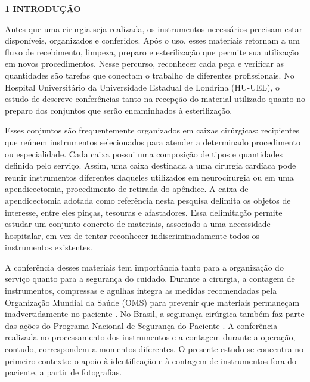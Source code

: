 \begingroup
\justifying
\setlength{\parindent}{1.25cm}
\setlength{\parskip}{0pt}
\onehalfspacing
\setlength{\emergencystretch}{1em}

{}
\noindent\textbf{1 INTRODUÇÃO}\par
\vspace{\baselineskip}

Antes que uma cirurgia seja realizada, os instrumentos necessários precisam estar disponíveis, organizados e conferidos. Após o uso, esses materiais retornam a um fluxo de recebimento, limpeza, preparo e esterilização que permite sua utilização em novos procedimentos. Nesse percurso, reconhecer cada peça e verificar as quantidades são tarefas que conectam o trabalho de diferentes profissionais. No Hospital Universitário da Universidade Estadual de Londrina (HU-UEL), o estudo de \textcite{moreto2025} descreve conferências tanto na recepção do material utilizado quanto no preparo dos conjuntos que serão encaminhados à esterilização.

Esses conjuntos são frequentemente organizados em caixas cirúrgicas: recipientes que reúnem instrumentos selecionados para atender a determinado procedimento ou especialidade. Cada caixa possui uma composição de tipos e quantidades definida pelo serviço. Assim, uma caixa destinada a uma cirurgia cardíaca pode reunir instrumentos diferentes daqueles utilizados em neurocirurgia ou em uma apendicectomia, procedimento de retirada do apêndice. A caixa de apendicectomia adotada como referência nesta pesquisa delimita os objetos de interesse, entre eles pinças, tesouras e afastadores. Essa delimitação permite estudar um conjunto concreto de materiais, associado a uma necessidade hospitalar, em vez de tentar reconhecer indiscriminadamente todos os instrumentos existentes.

A conferência desses materiais tem importância tanto para a organização do serviço quanto para a segurança do cuidado. Durante a cirurgia, a contagem de instrumentos, compressas e agulhas integra as medidas recomendadas pela Organização Mundial da Saúde (OMS) para prevenir que materiais permaneçam inadvertidamente no paciente \parencite{oms2009}. No Brasil, a segurança cirúrgica também faz parte das ações do Programa Nacional de Segurança do Paciente \parencite{brasil2014}. A conferência realizada no processamento dos instrumentos e a contagem durante a operação, contudo, correspondem a momentos diferentes. O presente estudo se concentra no primeiro contexto: o apoio à identificação e à contagem de instrumentos fora do paciente, a partir de fotografias.

